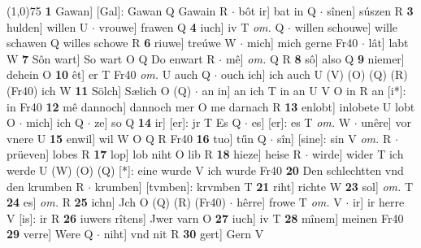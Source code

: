 \documentclass[8pt,a4paper,notitlepage]{article}
\begin{document}
\begin{table}[ht]
\begin{minipage}[t]{0.5\linewidth}
\line(1,0){75} \newline
\textbf{1} Gawan] [Gal]: Gawan Q Gawain R  $\cdot$ bôt ir] bat in Q  $\cdot$ sînen] súszen R \textbf{3} hulden] willen U  $\cdot$ vrouwe] frawen Q \textbf{4} iuch] iv T \textit{om.} Q  $\cdot$ willen schouwe] wille schawen Q willes schowe R \textbf{6} riuwe] treúwe W  $\cdot$ mich] mich gerne Fr40  $\cdot$ lât] labt W \textbf{7} Sôn wart] So wart O Q Do enwart R  $\cdot$ mê] \textit{om.} Q R \textbf{8} sô] also Q \textbf{9} niemer] dehein O \textbf{10} êt] er T Fr40 \textit{om.} U auch Q  $\cdot$ ouch ich] ich auch U (V) (O) (Q) (R) (Fr40) ich W \textbf{11} Sölch] Sælich O (Q)  $\cdot$ an in] an ich T in an U V O in R an [i*]: in Fr40 \textbf{12} mê dannoch] dannoch mer O me darnach R \textbf{13} enlobt] inlobete U lobt O  $\cdot$ mich] ich Q  $\cdot$ ze] so Q \textbf{14} ir] [er]: jr T Es Q  $\cdot$ es] [er]: es T \textit{om.} W  $\cdot$ unêre] vor vnere U \textbf{15} enwil] wil W O Q R Fr40 \textbf{16} tuo] tűn Q  $\cdot$ sîn] [sine]: sin V \textit{om.} R  $\cdot$ prüeven] lobes R \textbf{17} lop] lob niht O lib R \textbf{18} hieze] heise R  $\cdot$ wirde] wider T ich werde U (W) (O) (Q) [*]: eine wurde  V ich wurde Fr40 \textbf{20} Den schlechtten vnd den krumben R  $\cdot$ krumben] [tvmben]: krvmben T \textbf{21} riht] richte W \textbf{23} sol] \textit{om.} T \textbf{24} es] \textit{om.} R \textbf{25} ichn] Jch O (Q) (R) (Fr40)  $\cdot$ hêrre] frowe T \textit{om.} V  $\cdot$ ir] ir herre V [is]: ir R \textbf{26} iuwers rîtens] Jwer varn O \textbf{27} iuch] iv T \textbf{28} mînem] meinen Fr40 \textbf{29} verre] Were Q  $\cdot$ niht] vnd nit R \textbf{30} gert] Gern V \newline
\end{minipage}
\end{table}
\end{document}

